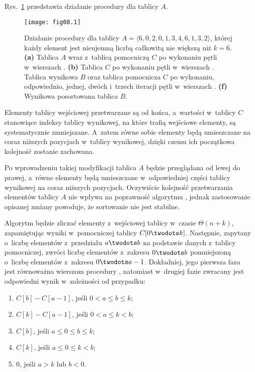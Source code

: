 
\exercise %
Rys.~\ref{fig:8.2-1} przedstawia działanie procedury  dla tablicy $A$.
\begin{figure}[ht]
	\begin{center}
		\texttt{[image: fig08.1]}
	\end{center}
	\caption{Działanie procedury  dla tablicy $A=\langle6,0,2,0,1,3,4,6,1,3,2\rangle$, której każdy element jest nieujemną liczbą całkowitą nie większą niż $k=6$. {\sffamily\bfseries(a)} Tablica $A$ wraz z~tablicą pomocniczą $C$ po wykonaniu pętli w~wierszach . {\sffamily\bfseries(b)} Tablica $C$ po wykonaniu pętli w~wierszach . {\sffamily\bfseries{}} Tablica wynikowa $B$ oraz tablica pomocnicza $C$ po wykonaniu, odpowiednio, jednej, dwóch i~trzech iteracji pętli  w~wierszach . {\sffamily\bfseries(f)} Wynikowa posortowana tablica $B$.} \label{fig:8.2-1}
\end{figure}

\exercise %
Elementy tablicy wejściowej przetwarzane są od końca, a~wartości w~tablicy $C$ stanowiące indeksy tablicy wynikowej, na które trafią wejściowe elementy, są systematycznie zmniejszane. A~zatem równe sobie elementy będą umieszczane na coraz niższych pozycjach w~tablicy wynikowej, dzięki czemu ich początkowa kolejność zostanie zachowana.

\exercise %
Po wprowadzeniu takiej modyfikacji tablica $A$ będzie przeglądana od lewej do prawej, a~równe elementy będą umieszczane w~odpowiedniej części tablicy wynikowej na coraz niższych pozycjach. Oczywiście kolejność przetwarzania elementów tablicy $A$ nie wpływa na poprawność algorytmu , jednak zastosowanie opisanej zmiany powoduje, że sortowanie nie jest stabilne.

\exercise %
Algorytm będzie zliczać elementy z~wejściowej tablicy w~czasie $\Theta(n+k)$, zapamiętując wyniki w~pomocniczej tablicy $C[0\twodots k]$. Następnie, zapytany o~liczbę elementów z~przedziału $a\twodots b$ na podstawie danych z~tablicy pomocniczej, zwróci liczbę elementów z~zakresu $0\twodots b$ pomniejszoną o~liczbę elementów z~zakresu $0\twodots a-1$. Dokładniej, jego pierwsza faza jest równoważna wierszom  procedury , natomiast w~drugiej fazie zwracany jest odpowiedni wynik w~zależności od przypadku:
\begin{enumerate}
	\item $C[b]-C[a-1]$, jeśli $0<a\le b\le k$;
	\item $C[k]-C[a-1]$, jeśli $0<a\le k<b$;
	\item $C[b]$, jeśli $a\le0\le b\le k$;
	\item $C[k]$, jeśli $a\le0\le k<b$;
    \item 0, jeśli $a>k$ lub $b<0$.
\end{enumerate}

